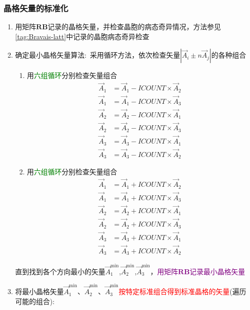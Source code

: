 \documentclass{article}      %
\begin{document}
\subsubsection{晶格矢量的标准化}
\begin{enumerate}
	\item 用矩阵$\mathbf{RB}$记录的晶格矢量，并检查晶胞的病态奇异情况，方法参见\ref{tag:Bravais-latt}中记录的晶胞病态奇异检查
	\item 确定最小晶格矢量算法:~采用循环方法，依次检查矢量$|\vec A_i\pm n\vec A_j|$的各种组合
		\begin{enumerate}
			\item 用\textcolor{green}{六组循环}分别检查矢量组合
				\begin{displaymath}
					\begin{aligned}
						\vec A_1&=\vec A_1-\mathit{ICOUNT}\times\vec A_2\\
						\vec A_1&=\vec A_1-\mathit{ICOUNT}\times\vec A_3\\
						\vec A_2&=\vec A_2-\mathit{ICOUNT}\times\vec A_1\\
						\vec A_2&=\vec A_2-\mathit{ICOUNT}\times\vec A_3\\
						\vec A_3&=\vec A_3-\mathit{ICOUNT}\times\vec A_1\\
						\vec A_3&=\vec A_3-\mathit{ICOUNT}\times\vec A_2
					\end{aligned}
				\end{displaymath}
			\item 用\textcolor{green}{六组循环}分别检查矢量组合
				\begin{displaymath}
					\begin{aligned}
						\vec A_1&=\vec A_1+\mathit{ICOUNT}\times\vec A_2\\
						\vec A_1&=\vec A_1+\mathit{ICOUNT}\times\vec A_3\\
						\vec A_2&=\vec A_2+\mathit{ICOUNT}\times\vec A_1\\
						\vec A_2&=\vec A_2+\mathit{ICOUNT}\times\vec A_3\\
						\vec A_3&=\vec A_3+\mathit{ICOUNT}\times\vec A_1\\
						\vec A_3&=\vec A_3+\mathit{ICOUNT}\times\vec A_2
					\end{aligned}
				\end{displaymath}
		\end{enumerate}
		直到找到各个方向最小的矢量$\vec A_1^{\mathrm{min}}$,$\vec A_2^{\mathrm{min}}$,$\vec A_3^{\mathrm{min}}$，\textcolor{purple}{用矩阵$\mathbf{RB}$记录最小晶格矢量}
			\item 将最小晶格矢量$\vec A_1^{\mathrm{min}}$、$\vec A_2^{\mathrm{min}}$、$\vec A_3^{\mathrm{min}}$\textcolor{red}{按特定标准组合得到标准晶格的矢量}(遍历可能的组合):

\end{enumerate}
\end{document}
